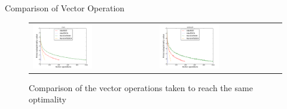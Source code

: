 \begin{frame}{Comparison of Vector Operation}
\begin{figure}[htbp]
\begin{tabular}{ll}
    \centering
        \includegraphics[width=0.5\textwidth]{images/comp_adas_vector_rcv1.pdf} &
        \includegraphics[width=0.5\textwidth]{images/comp_adas_vector_astro.pdf}
\end{tabular}
        \caption{Comparison of the vector operations taken to reach the same optimality}
     \label{fig:vectorop}
\end{figure}
\end{frame}

